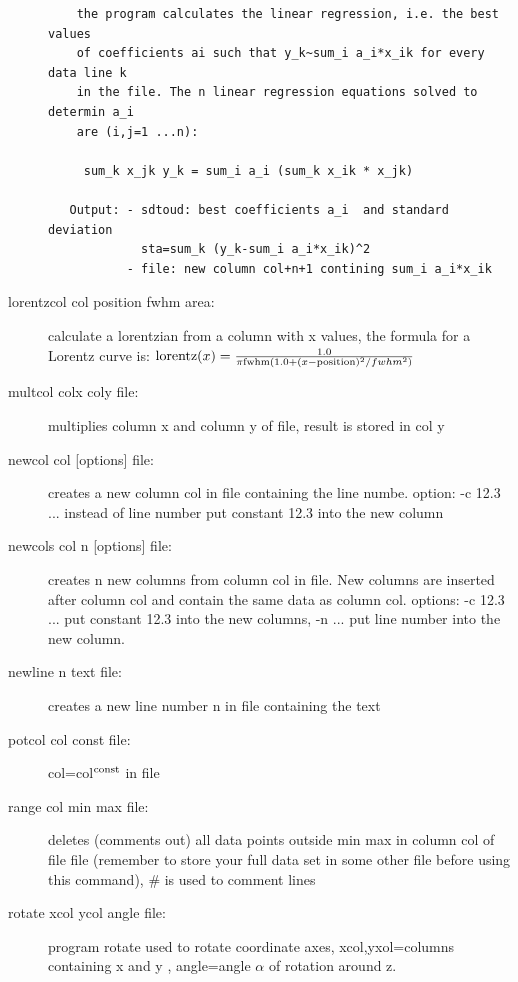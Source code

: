 \begin{description}
\begin{verbatim}
    the program calculates the linear regression, i.e. the best values
    of coefficients ai such that y_k~sum_i a_i*x_ik for every data line k
    in the file. The n linear regression equations solved to determin a_i
    are (i,j=1 ...n):

     sum_k x_jk y_k = sum_i a_i (sum_k x_ik * x_jk)

   Output: - sdtoud: best coefficients a_i  and standard deviation
             sta=sum_k (y_k-sum_i a_i*x_ik)^2
           - file: new column col+n+1 contining sum_i a_i*x_ik
\end{verbatim}

\item [\prg lorentzcol\index{lorentzcol} col position fwhm area:] calculate a lorentzian from
a column with x values, the formula for a Lorentz curve is: 
${\rm lorentz}(x)=\frac{1.0}{\pi{\rm fwhm}(1.0+(x-{\rm position})^2/fwhm^2)}$
\item [\prg multcol\index{multcol}  colx coly file:] multiplies column x and column y of file, %
result is stored in col y
\item [\prg newcol\index{newcol} col {[options]} file:] creates a new column col in file containing the line numbe. option: -c 12.3  ... instead of line number put constant 12.3 into the new column
\item [\prg newcols\index{newcols} col n {[options]} file:] creates n new columns from column col
 in file. New columns are inserted after column col and contain the same data as column col.
 options: -c 12.3 ...  put constant 12.3 into the new columns, -n ... put line number into the new column.
\item [\prg newline\index{newline} n text file:] creates a new line number n  in file containing %
the text 
\item [\prg potcol\index{potcol} col const file:]  col=col$^{\rm const}$ in file
\item [\prg range\index{range} col min max file:] deletes (comments out) all data points outside %
min max in column  col of
                       file file (remember to store your full data set in some other
		       file before using this command), \# is used to comment lines
\item[\prg rotate\index{rotate} xcol ycol angle file:]
program rotate  used to rotate coordinate axes,
 xcol,yxol=columns containing x and y , 
 angle=angle $\alpha$ of rotation around z.
 

\end{description}
